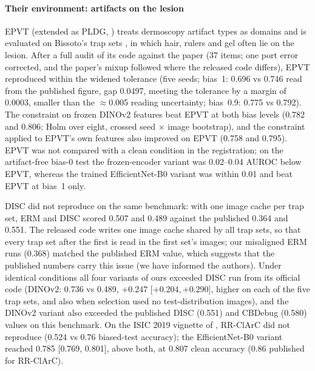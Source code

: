 \paragraph{Their environment: artifacts on the lesion} EPVT \citep{yan2023epvt} (extended as PLDG, \citealp{yan2025pldg}) treats dermoscopy artifact
types as domains and is evaluated on Bissoto's trap sets \citep{bissoto2022artifact}, in which hair, rulers and gel
often lie on the lesion. After a full audit of its code against the paper (37 items; one port error corrected, and the
paper's mixup followed where the released code differs), EPVT reproduced within the widened tolerance (five seeds;
bias~1: 0.696 vs 0.746 read from the published figure, gap 0.0497, meeting the tolerance by a margin of 0.0003, smaller than the $\approx$0.005 reading uncertainty; bias~0.9:
0.775 vs 0.792). The constraint on frozen DINOv2 features beat EPVT at both bias levels (0.782 and 0.806; Holm over
eight, crossed seed $\times$ image bootstrap), and the constraint applied to EPVT's own features also improved on EPVT
(0.758 and 0.795). EPVT was not compared with a clean condition in the registration; on the artifact-free bias-0 test
the frozen-encoder variant was 0.02--0.04 AUROC below EPVT, whereas the trained EfficientNet-B0 variant was within 0.01
and beat EPVT at bias~1 only.

DISC \citep{wu2023disc} did not reproduce on the same benchmark: with one image cache per trap set, ERM and DISC scored
0.507 and 0.489 against the published 0.364 and 0.551. The released code writes one image cache shared by all trap sets,
so that every trap set after the first is read in the first set's images; our misaligned ERM runs (0.368) matched the
published ERM value, which suggests that the published numbers carry this issue (we have informed the authors). Under
identical conditions all four variants of ours exceeded DISC run from its official code (DINOv2: 0.736 vs 0.489, $+0.247$
[$+0.204, +0.290$], higher on each of the five trap sets, and also when selection used no test-distribution images), and
the DINOv2 variant also exceeded the published DISC (0.551) and CBDebug \citep{enouen2026cbdebug} (0.580) values on this
benchmark. On the ISIC 2019 vignette of \citet{pahde2025ensuring}, RR-ClArC did not reproduce (0.524 vs 0.76 biased-test
accuracy); the EfficientNet-B0 variant reached 0.785 [0.769, 0.801], above both, at 0.807 clean accuracy (0.86 published
for RR-ClArC).

